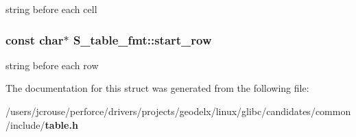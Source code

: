 string before each cell 
\subsubsection{\setlength{\rightskip}{0pt plus 5cm}const char$\ast$ S\_\-table\_\-fmt::start\_\-row}\label{structS__table__fmt_m3}


string before each row 

The documentation for this struct was generated from the following file:\begin{CompactItemize}
\item 
/users/jcrouse/perforce/drivers/projects/geodelx/linux/glibc/candidates/common/include/{\bf table.h}\end{CompactItemize}
